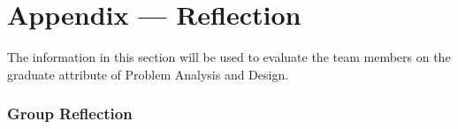 \documentclass[12pt, titlepage]{article}
\begin{document}

\newpage

\section{Appendix --- Reflection}


The information in this section will be used to evaluate the team members on the
graduate attribute of Problem Analysis and Design.



\subsubsection*{Group Reflection}
\end{document}
